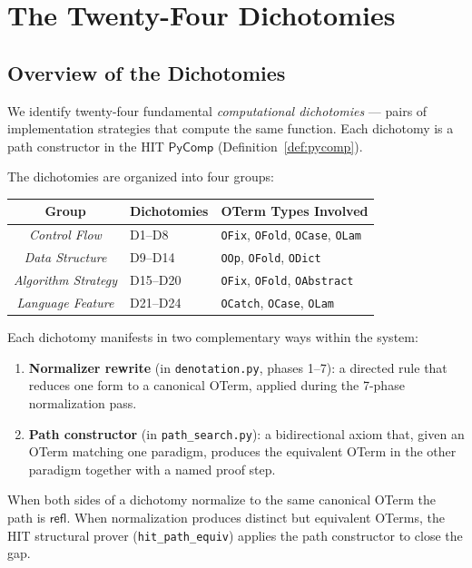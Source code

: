 \documentclass[11pt,a4paper]{report}
\theoremstyle{definition}
\theoremstyle{plain}
\begin{document}
\part{The Twenty-Four Dichotomies}

\chapter{Overview of the Dichotomies}
\label{ch:dichotomy-overview}

We identify twenty-four fundamental \emph{computational dichotomies}
--- pairs of implementation strategies that compute the same function.
Each dichotomy is a path constructor in the HIT $\mathsf{PyComp}$
(Definition~\ref{def:pycomp}).

The dichotomies are organized into four groups:

\begin{center}
\begin{tabular}{c l l}
  \textbf{Group} & \textbf{Dichotomies} & \textbf{OTerm Types Involved} \\
  \hline
  \emph{Control Flow} & D1--D8 & \texttt{OFix}, \texttt{OFold}, \texttt{OCase}, \texttt{OLam} \\
  \emph{Data Structure} & D9--D14 & \texttt{OOp}, \texttt{OFold}, \texttt{ODict} \\
  \emph{Algorithm Strategy} & D15--D20 & \texttt{OFix}, \texttt{OFold}, \texttt{OAbstract} \\
  \emph{Language Feature} & D21--D24 & \texttt{OCatch}, \texttt{OCase}, \texttt{OLam} \\
\end{tabular}
\end{center}

Each dichotomy manifests in two complementary ways within the system:
\begin{enumerate}
  \item \textbf{Normalizer rewrite} (in \texttt{denotation.py}, phases 1--7):
    a directed rule that reduces one form to a canonical OTerm,
    applied during the 7-phase normalization pass.
  \item \textbf{Path constructor} (in \texttt{path\_search.py}):
    a bidirectional axiom that, given an OTerm matching one paradigm,
    produces the equivalent OTerm in the other paradigm together with
    a named proof step.
\end{enumerate}
When both sides of a dichotomy normalize to the same canonical OTerm
the path is $\mathsf{refl}$.  When normalization produces distinct
but equivalent OTerms, the HIT structural prover
(\texttt{hit\_path\_equiv}) applies the path constructor to close the
gap.
\end{document}
